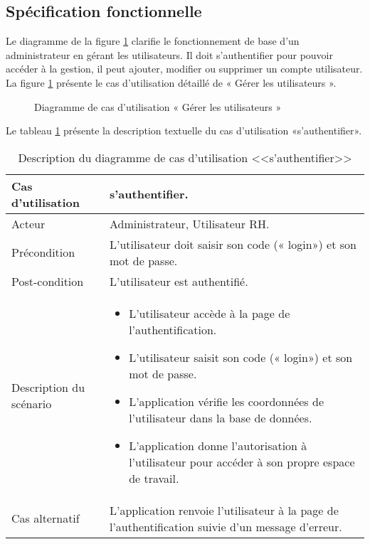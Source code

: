 \subsection{Spécification fonctionnelle}
Le diagramme de la figure \ref{fig:release2sprint3} clarifie le fonctionnement de base d’un administrateur en gérant
les utilisateurs. Il doit s’authentifier pour pouvoir accéder à la gestion, il peut ajouter, modifier ou
supprimer un compte utilisateur.\\
La figure \ref{fig:release2sprint3} présente le cas d’utilisation détaillé de « Gérer les utilisateurs ».
\newpage
\begin{figure}[htpb]
    \centering
    \caption{Diagramme de cas d’utilisation « Gérer les utilisateurs »}
    \label{fig:release2sprint3}
    \end{figure}

    Le tableau \ref{tab:authentifierutilisateur} présente la description textuelle du cas d’utilisation «s'authentifier».
\begin{longtable}[c]{
    |p{}
    |p{}|
}
    \caption{Description du diagramme de cas d’utilisation <<s'authentifier>>}
    \label{tab:authentifierutilisateur}\\
    \hline
    
    Cas d’utilisation
    &  s'authentifier. \\
    \hline 
    
    Acteur
    & Administrateur, Utilisateur RH. \\
    \hline 
    
    Précondition
    & L’utilisateur doit saisir son code (« login») et son mot de passe. \\
    \hline
    
    Post-condition
    & L’utilisateur est authentifié. \\
    \hline
    
    Description du
scénario

    &      \begin{itemize}
    \item L’utilisateur accède à la page de l’authentification.
    \item L’utilisateur saisit son code (« login») et son mot de passe.
     \item L’application vérifie les coordonnées de l’utilisateur dans la base de données.
     \item L’application donne l’autorisation à l’utilisateur pour accéder à son propre espace de travail.
    \end{itemize}  \\
    \hline
    
   Cas alternatif
    & L’application renvoie l’utilisateur à la page de l’authentification suivie d’un message d’erreur.
 \\ \hline
   
\end{longtable}



